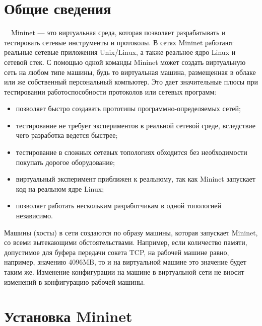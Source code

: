 \documentclass[
  13pt,
  fontsize=13pt,
  russian,
  a4paper,
,captions=tableheading
]{scrreprt}
\providecommand{\tightlist}{%
  \setlength{\itemsep}{0pt}\setlength{\parskip}{0pt}}
\begin{document}
\hypertarget{ux43eux431ux449ux438ux435-ux441ux432ux435ux434ux435ux43dux438ux44f}{%
\section{Общие
сведения}\label{ux43eux431ux449ux438ux435-ux441ux432ux435ux434ux435ux43dux438ux44f}}

\(\quad\)Mininet \autocite{mininet} --- это виртуальная среда, которая
позволяет разрабатывать и тестировать сетевые инструменты и протоколы. В
сетях Mininet работают реальные сетевые приложения Unix/Linux, а также
реальное ядро Linux и сетевой стек. С помощью одной команды Mininet
может создать виртуальную сеть на любом типе машины, будь то виртуальная
машина, размещенная в облаке или же собственный персональный компьютер.
Это дает значительные плюсы при тестировании работоспособности
протоколов или сетевых программ:

\begin{itemize}
\tightlist
\item
  позволяет быстро создавать прототипы программно-определяемых сетей;
\item
  тестирование не требует экспериментов в реальной сетевой среде,
  вследствие чего разработка ведется быстрее;
\item
  тестирование в сложных сетевых топологиях обходится без необходимости
  покупать дорогое оборудование;
\item
  виртуальный эксперимент приближен к реальному, так как Mininet
  запускает код на реальном ядре Linux;
\item
  позволяет работать нескольким разработчикам в одной топологией
  независимо.
\end{itemize}

Машины (хосты) в сети создаются по образу машины, которая запускает
Mininet, со всеми вытекающими обстоятельствами. Например, если
количество памяти, допустимое для буфера передачи сокета TCP, на рабочей
машине равно, например, значению 4096MB, то и на виртуальной машине это
значение будет таким же. Изменение конфигурации на машине в виртуальной
сети не вносит изменений в конфигурацию рабочей машины.

\hypertarget{ux443ux441ux442ux430ux43dux43eux432ux43aux430-mininet}{%
\section{Установка
Mininet}\label{ux443ux441ux442ux430ux43dux43eux432ux43aux430-mininet}}
\end{document}
